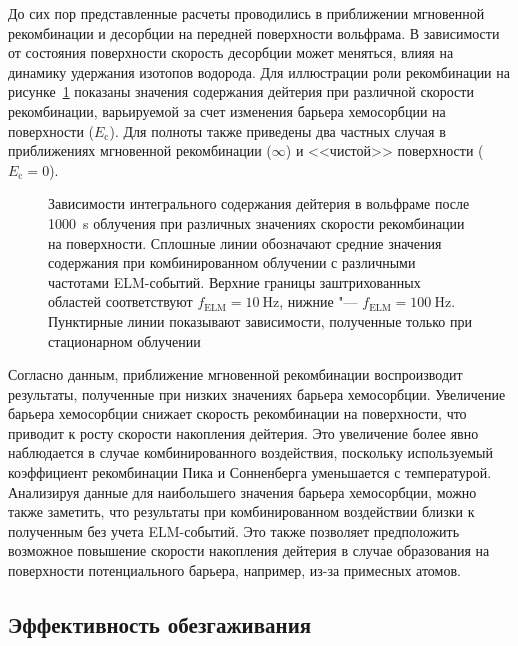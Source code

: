 До сих пор представленные расчеты проводились в приближении мгновенной рекомбинации и десорбции на передней поверхности вольфрама. В зависимости от состояния поверхности скорость десорбции может меняться, влияя на динамику удержания изотопов водорода. Для иллюстрации роли рекомбинации на рисунке~\cref{fig:ch3/rec_var} показаны значения содержания дейтерия при различной скорости рекомбинации, варьируемой за счет изменения барьера хемосорбции на поверхности ($E_{\mathrm{c}}$). Для полноты также приведены два частных случая в приближениях мгновенной рекомбинации ($\infty$) и <<чистой>> поверхности ($E_{\mathrm{c}}=0$).

\begin{figure}[ht]
	\caption{Зависимости интегрального содержания дейтерия в вольфраме после \SI{1000}{\second} облучения при различных значениях скорости рекомбинации на поверхности. Сплошные линии обозначают средние значения содержания при комбинированном облучении с различными частотами ELM-событий. Верхние границы заштрихованных областей соответствуют \(f_\mathrm{ELM} = \SI{10}{\hertz}\), нижние "--- \(f_\mathrm{ELM} = \SI{100}{\hertz}\). Пунктирные линии показывают зависимости, полученные только при стационарном облучении}\label{fig:ch3/rec_var}
\end{figure}

Согласно данным, приближение мгновенной рекомбинации воспроизводит результаты, полученные при низких значениях барьера хемосорбции. Увеличение барьера хемосорбции снижает скорость рекомбинации на поверхности, что приводит к росту скорости накопления дейтерия. Это увеличение более явно наблюдается в случае комбинированного воздействия, поскольку используемый коэффициент рекомбинации Пика и Сонненберга уменьшается с температурой. Анализируя данные для наибольшего значения барьера хемосорбции, можно также заметить, что результаты при комбинированном воздействии близки к полученным без учета ELM-событий. Это также позволяет предположить возможное повышение скорости накопления дейтерия в случае образования на поверхности потенциального барьера, например, из-за примесных атомов.

\subsection{Эффективность обезгаживания}

